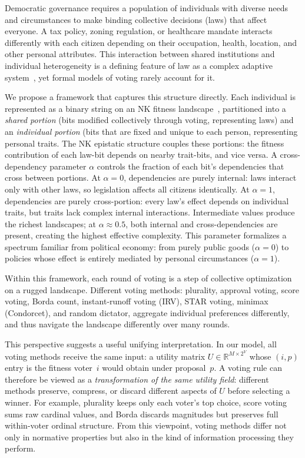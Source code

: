 Democratic governance requires a population of individuals with diverse needs and
circumstances to make binding collective decisions (laws) that affect everyone.
A tax policy, zoning regulation, or healthcare mandate interacts differently with
each citizen depending on their occupation, health, location, and other personal
attributes. This interaction between shared institutions and individual
heterogeneity is a defining feature of law as a complex adaptive
system~\citep{ruhl1996fitness}, yet formal models of voting rarely account for
it.

We propose a framework that captures this structure directly. Each individual is
represented as a binary string on an NK fitness landscape~\citep{kauffman1993origins},
partitioned into a \emph{shared portion} (bits modified collectively through
voting, representing laws) and an \emph{individual portion} (bits that are
fixed and unique to each person, representing personal traits. The NK epistatic
structure couples these portions: the fitness contribution of each law-bit
depends on nearby trait-bits, and vice versa. A cross-dependency parameter
$\alpha$ controls the fraction of each bit's dependencies that cross between
portions. At $\alpha=0$, dependencies are purely internal: laws interact only
with other laws, so legislation affects all citizens identically. At $\alpha=1$,
dependencies are purely cross-portion: every law's effect depends on individual
traits, but traits lack complex internal interactions. Intermediate values produce
the richest landscapes; at $\alpha \approx 0.5$, both internal and
cross-dependencies are present, creating the highest effective complexity. This
parameter formalizes a spectrum familiar from political economy: from purely
public goods ($\alpha=0$) to policies whose effect is entirely mediated by
personal circumstances ($\alpha=1$).

Within this framework, each round of voting is a step of collective optimization
on a rugged landscape. Different voting methods: plurality, approval voting,
score voting, Borda count, instant-runoff voting (IRV), STAR voting, minimax
(Condorcet), and random dictator, aggregate individual preferences differently,
and thus navigate the landscape differently over many rounds.

This perspective suggests a useful unifying interpretation. In our model, all
voting methods receive the same input: a utility matrix
$U \in \mathbb{R}^{M \times 2^V}$ whose $(i,p)$ entry is the fitness voter~$i$
would obtain under proposal~$p$. A voting rule can therefore be viewed as a
\emph{transformation of the same utility field}: different methods preserve,
compress, or discard different aspects of $U$ before selecting a winner. For
example, plurality keeps only each voter's top choice, score voting sums raw
cardinal values, and Borda discards magnitudes but preserves full within-voter
ordinal structure. From this viewpoint, voting methods differ not only in
normative properties but also in the kind of information processing they
perform.

